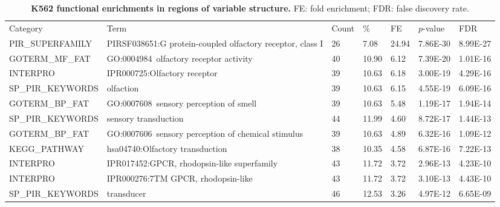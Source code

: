 \documentclass[a4paper,11pt,oneside]{book}
\begin{document}
\clearpage

{\scriptsize 
\begin{longtable}{lllllll}
\caption[K562 functional enrichments in regions of variable structure.]{
{\bf K562 functional enrichments in regions of variable structure. }
FE: fold enrichment; FDR: false discovery rate.
}\label{tab:k5go}\\
\endfirsthead

Category          & Term
& Count & \%    & FE & $p$-value   & FDR      \\
PIR\_SUPERFAMILY  & PIRSF038651:G protein-coupled olfactory receptor, class I       & 26    & 7.08  & 24.94           & 7.86E-30 & 8.99E-27 \\
GOTERM\_MF\_FAT   & GO:0004984~olfactory receptor activity                          & 40    & 10.90 & 6.12            & 7.39E-20 & 1.01E-16 \\
INTERPRO          & IPR000725:Olfactory receptor                                    & 39    & 10.63 & 6.18            & 3.00E-19 & 4.29E-16 \\
SP\_PIR\_KEYWORDS & olfaction                                                       & 39    & 10.63 & 6.15            & 4.55E-19 & 6.09E-16 \\
GOTERM\_BP\_FAT   & GO:0007608~sensory perception of smell                          & 39    & 10.63 & 5.48            & 1.19E-17 & 1.94E-14 \\
SP\_PIR\_KEYWORDS & sensory transduction                                            & 44    & 11.99 & 4.60            & 8.72E-17 & 1.44E-13 \\
GOTERM\_BP\_FAT   & GO:0007606~sensory perception of chemical stimulus              & 39    & 10.63 & 4.89            & 6.32E-16 & 1.09E-12 \\
KEGG\_PATHWAY     & hsa04740:Olfactory transduction                                 & 38    & 10.35 & 4.58            & 6.87E-16 & 7.22E-13 \\
INTERPRO          & IPR017452:GPCR, rhodopsin-like superfamily                      & 43    & 11.72 & 3.72            & 2.96E-13 & 4.23E-10 \\
INTERPRO          & IPR000276:7TM GPCR, rhodopsin-like                              & 43    & 11.72 & 3.72            & 3.10E-13 & 4.43E-10 \\
SP\_PIR\_KEYWORDS & transducer                                                      & 46    & 12.53 & 3.26            & 4.97E-12 & 6.65E-09 \\

\end{longtable}}
\end{document}

